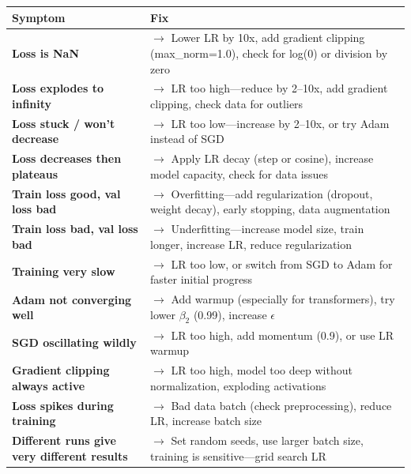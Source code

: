 \documentclass[../main.tex]{subfiles}
\begin{document}
\begin{table}[htbp]
\centering
\renewcommand{\arraystretch}{1.4}
\begin{tabularx}{\textwidth}{@{}>{\bfseries}lX@{}}
\toprule
\textbf{Symptom} & \textbf{Fix} \\
\midrule

Loss is NaN &
$\rightarrow$ Lower LR by 10x, add gradient clipping (max\_norm=1.0), check for log(0) or division by zero \\

Loss explodes to infinity &
$\rightarrow$ LR too high---reduce by 2--10x, add gradient clipping, check data for outliers \\

Loss stuck / won't decrease &
$\rightarrow$ LR too low---increase by 2--10x, or try Adam instead of SGD \\

Loss decreases then plateaus &
$\rightarrow$ Apply LR decay (step or cosine), increase model capacity, check for data issues \\

Train loss good, val loss bad &
$\rightarrow$ Overfitting---add regularization (dropout, weight decay), early stopping, data augmentation \\

Train loss bad, val loss bad &
$\rightarrow$ Underfitting---increase model size, train longer, increase LR, reduce regularization \\

Training very slow &
$\rightarrow$ LR too low, or switch from SGD to Adam for faster initial progress \\

Adam not converging well &
$\rightarrow$ Add warmup (especially for transformers), try lower $\beta_2$ (0.99), increase $\epsilon$ \\

SGD oscillating wildly &
$\rightarrow$ LR too high, add momentum (0.9), or use LR warmup \\

Gradient clipping always active &
$\rightarrow$ LR too high, model too deep without normalization, exploding activations \\

Loss spikes during training &
$\rightarrow$ Bad data batch (check preprocessing), reduce LR, increase batch size \\

Different runs give very different results &
$\rightarrow$ Set random seeds, use larger batch size, training is sensitive---grid search LR \\


\end{tabularx}
\end{table}
\end{document}
